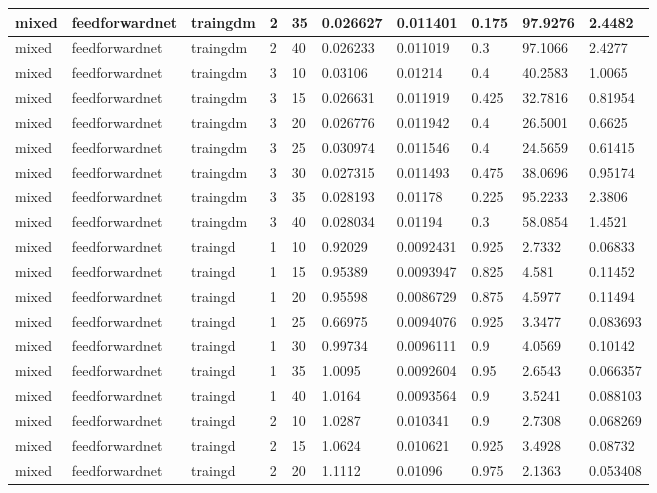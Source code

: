 \begin{longtable}{lllllllll}
mixed & feedforwardnet & traingdm & 2 & 35 & 0.026627 & 0.011401 & 0.175 & 97.9276 & 2.4482 \\ \hline 
mixed & feedforwardnet & traingdm & 2 & 40 & 0.026233 & 0.011019 & 0.3 & 97.1066 & 2.4277 \\ \hline 
mixed & feedforwardnet & traingdm & 3 & 10 & 0.03106 & 0.01214 & 0.4 & 40.2583 & 1.0065 \\ \hline 
mixed & feedforwardnet & traingdm & 3 & 15 & 0.026631 & 0.011919 & 0.425 & 32.7816 & 0.81954 \\ \hline 
mixed & feedforwardnet & traingdm & 3 & 20 & 0.026776 & 0.011942 & 0.4 & 26.5001 & 0.6625 \\ \hline 
mixed & feedforwardnet & traingdm & 3 & 25 & 0.030974 & 0.011546 & 0.4 & 24.5659 & 0.61415 \\ \hline 
mixed & feedforwardnet & traingdm & 3 & 30 & 0.027315 & 0.011493 & 0.475 & 38.0696 & 0.95174 \\ \hline 
mixed & feedforwardnet & traingdm & 3 & 35 & 0.028193 & 0.01178 & 0.225 & 95.2233 & 2.3806 \\ \hline 
mixed & feedforwardnet & traingdm & 3 & 40 & 0.028034 & 0.01194 & 0.3 & 58.0854 & 1.4521 \\ \hline 
mixed & feedforwardnet & traingd & 1 & 10 & 0.92029 & 0.0092431 & 0.925 & 2.7332 & 0.06833 \\ \hline 
mixed & feedforwardnet & traingd & 1 & 15 & 0.95389 & 0.0093947 & 0.825 & 4.581 & 0.11452 \\ \hline 
mixed & feedforwardnet & traingd & 1 & 20 & 0.95598 & 0.0086729 & 0.875 & 4.5977 & 0.11494 \\ \hline 
mixed & feedforwardnet & traingd & 1 & 25 & 0.66975 & 0.0094076 & 0.925 & 3.3477 & 0.083693 \\ \hline 
mixed & feedforwardnet & traingd & 1 & 30 & 0.99734 & 0.0096111 & 0.9 & 4.0569 & 0.10142 \\ \hline 
mixed & feedforwardnet & traingd & 1 & 35 & 1.0095 & 0.0092604 & 0.95 & 2.6543 & 0.066357 \\ \hline 
mixed & feedforwardnet & traingd & 1 & 40 & 1.0164 & 0.0093564 & 0.9 & 3.5241 & 0.088103 \\ \hline 
mixed & feedforwardnet & traingd & 2 & 10 & 1.0287 & 0.010341 & 0.9 & 2.7308 & 0.068269 \\ \hline 
mixed & feedforwardnet & traingd & 2 & 15 & 1.0624 & 0.010621 & 0.925 & 3.4928 & 0.08732 \\ \hline 
mixed & feedforwardnet & traingd & 2 & 20 & 1.1112 & 0.01096 & 0.975 & 2.1363 & 0.053408 \\ \hline 

\end{longtable}
